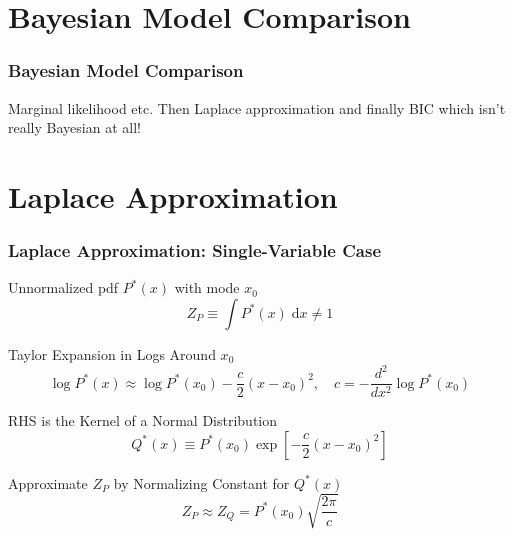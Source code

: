 \section{Bayesian Model Comparison}
\begin{frame}
  \frametitle{Bayesian Model Comparison}
  Marginal likelihood etc. Then Laplace approximation and finally BIC which isn't really Bayesian at all!
\end{frame}
\section{Laplace Approximation}
\begin{frame}
  \frametitle{Laplace Approximation: Single-Variable Case}

  \small


  \begin{block}{Unnormalized pdf $P^*(x)$ with mode $x_0$}
    \vspace{-1em}
   \[
Z_P \equiv \int P^*(x) \;\text{d}x \neq 1
   \]
  \end{block}
  \pause

  \vspace{-1em}

  \begin{block}{Taylor Expansion in Logs Around $x_0$}
    \vspace{-1em}
  \[
    \log P^*(x) \approx \log P^*(x_0) - \frac{c}{2}(x - x_0)^2, \quad c = -\frac{d^2}{dx^2} \log P^*(x_0)
  \]
  \end{block}
  \pause

  \vspace{-1em}

  \begin{block}{RHS is the Kernel of a Normal Distribution}
    \vspace{-1em}
    \[
      Q^*(x) \equiv P^*(x_0) \exp \left[ -\frac{c}{2}(x - x_0)^2 \right]
    \]
  \end{block}

  \vspace{-1em}

  \pause

  \begin{block}{Approximate $Z_P$ by Normalizing Constant for $Q^*(x)$}
    \vspace{-1em}
    \[
      Z_P \approx Z_Q = P^*(x_0) \sqrt{\frac{2\pi}{c}}
    \]
  \end{block}

\end{frame}
